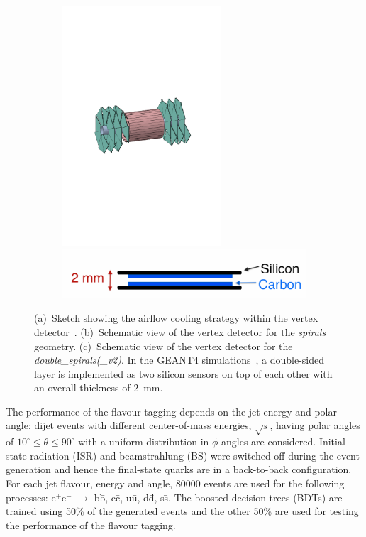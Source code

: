 \begin{figure}[htbp]
\begin{subfigure}[b]{0.25\textwidth}
    \includegraphics[trim = 32mm 98mm 85mm 106mm, clip, width=0.65\textwidth]{figures/CLIC/double_spiral.pdf} \\
    \includegraphics[width=1.5\textwidth]{figures/CLIC/double_layer_module.png} 
    \caption{}
    \label{fig:doubleLayer}
  \end{subfigure}
  \caption{(a)~Sketch showing the airflow cooling strategy within the
    vertex detector~\cite{DuarteRamos:1572989}. (b)~Schematic view of
    the vertex detector for the \emph{spirals} geometry. (c)~Schematic
    view of the vertex detector for the
    \emph{double\_spirals(\_v2)}. In the \textsc{GEANT4}
    simulations~\cite{Agostinelli:2002hh}, a double-sided layer is
    implemented as two silicon sensors on top of each other with an
    overall thickness of \SI{2}{\milli\meter}.}
  \label{fig:geometries}
\end{figure}

The performance of the flavour tagging depends on the jet energy and
polar angle: dijet events with different center-of-mass energies,
$\sqrt{s}$, having polar angles of $10^{\circ} \leq \theta \leq
90^{\circ}$ with a uniform distribution in $\phi$ angles are
considered. Initial state radiation (ISR) and beamstrahlung (BS) were
switched off during the event generation and hence the final-state
quarks are in a back-to-back configuration. For each jet flavour,
energy and angle, 80000 events are used for the following processes:
e$^+$e$^-$ $\rightarrow$ b\={b}, c\={c}, u\={u}, d\={d}, s\={s}. The
boosted decision trees (BDTs) are trained using 50\% of the generated
events and the other 50\% are used for testing the performance of the
flavour tagging.

